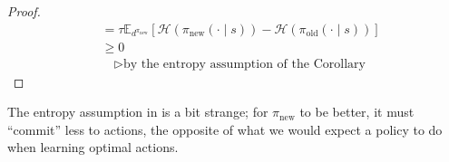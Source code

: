 \documentclass[twoside,11pt]{article}
\newcommand{\Ex}{\mathbb{E}}
\newcommand{\KL}{\mathrm{KL}}
\newcommand{\entropy}{\mathcal{H}}
\newcommand{\pinew}{{\pi_\mathrm{new}}}
\newcommand{\piold}{{\pi_\mathrm{old}}}
\begin{document}
\begin{proof}
\begin{align*}
    &= \tau \Ex_{d^\pinew}[ \entropy (\pinew(\cdot \mid s)) - \entropy(\piold(\cdot \mid s))]\\
    &\geq 0\\
    &\quad \triangleright \text{by the entropy assumption of the Corollary}
\end{align*}
\end{proof}
\noindent The entropy assumption in  is a bit strange; for $\pinew$ to be better, it must ``commit'' less to actions, the opposite of what we would expect a policy to do when learning optimal actions. 
\end{document}
